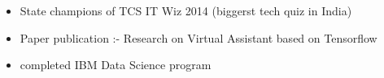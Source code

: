 %
%
%

\twocolumnsection
{
\begin{skills}
\end{skills}}
{
\vspace{1em}
\begin{itemize}
	\item State champions of TCS IT Wiz 2014 (biggerst tech quiz in India)
	\item Paper publication :- Research on Virtual Assistant based on Tensorflow 
    \item completed IBM Data Science program 
\end{itemize}
}
